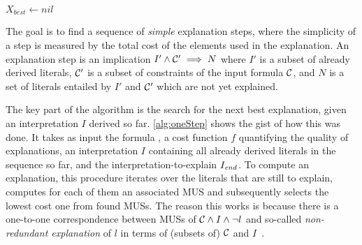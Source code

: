 \newcommand\onestep{\ensuremath{\call{explain-One-Step}}\xspace}

\begin{algorithm}[t]
  \caption{$\onestep(\formulac,f,I,\Iend)$}
  \label{alg:oneStep}
$X_{best} \gets \mathit{nil}$\;
\end{algorithm}


The goal is to find a sequence of \textit{simple} explanation steps, where the simplicity of a step is measured by the total cost of the elements used in the explanation.
An explanation step is an implication $I' \wedge \mathcal{C} ' \implies N$ where $I'$ is a subset of already derived literals, $\mathcal{C} '$ is a subset of constraints of the input formula $\mathcal{C} $, and $N$ is a set of literals entailed by $I'$ and $\mathcal{C} '$ which are not yet explained.

%
The key part of the algorithm is the search for the next best explanation, given an interpretation $I$ derived so far. 
\cref{alg:oneStep} shows the gist of how this was done.
It takes as input the formula \formulac, a cost function $f$ quantifying the quality of explanations, an interpretation $I$ containing all already derived literals in the sequence so far, and the interpretation-to-explain $I_\mathit{end} $. 
To compute an explanation, this procedure iterates over the literals that are still to explain, computes for each of them an associated MUS and subsequently selects the lowest cost one from found MUSs.
The reason this works is because there is a one-to-one correspondence between MUSs of $\mathcal{C}  \land I \land \neg l$ and so-called \emph{non-redundant explanation} of $l$ in terms of (subsets of) $\mathcal{C} $ and $I$~\cite{ecai/BogaertsGCG20}. 

